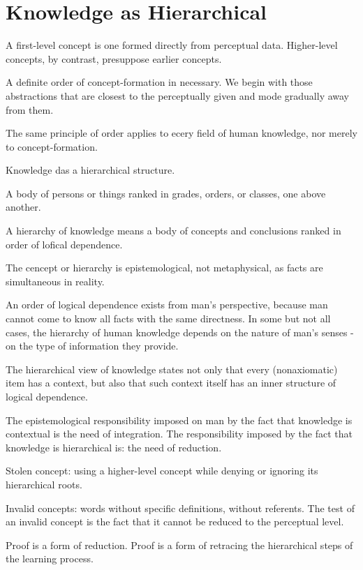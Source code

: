     \section{Knowledge as Hierarchical}

        A first-level concept is one formed directly from perceptual data. Higher-level concepts, by contrast, presuppose earlier concepts.

        A definite order of concept-formation in necessary. We begin with those abstractions that are closest to the perceptually given and mode gradually away from them.

        The same principle of order applies to ecery field of human knowledge, nor merely to concept-formation.

        Knowledge das a hierarchical structure.

            \begin{definition}[Hierarchy]
                A body of persons or things ranked in grades, orders, or classes, one above another.
            \end{definition}

        A hierarchy of knowledge means a body of concepts and conclusions ranked in order of lofical dependence.

        The cencept or hierarchy is epistemological, not metaphysical, as facts are simultaneous in reality.

        An order of logical dependence exists from man's perspective, because man cannot come to know all facts with the same directness. In some but not all cases, the hierarchy of human knowledge depends on the nature of man's senses -  on the type of information they provide.

        The hierarchical view of knowledge states not only that every (nonaxiomatic) item has a context, but also that such context itself has an inner structure of logical dependence.

        The epistemological responsibility imposed on man by the fact that knowledge is contextual is the need of integration. The responsibility imposed by the fact that knowledge is hierarchical is: the need of reduction.

        Stolen concept: using a higher-level concept while denying or ignoring its hierarchical roots.

        Invalid concepts: words without specific definitions, without referents. The test of an invalid concept is the fact that it cannot be reduced to the perceptual level.

        Proof is a form of reduction. Proof is a form of retracing the hierarchical steps of the learning process.